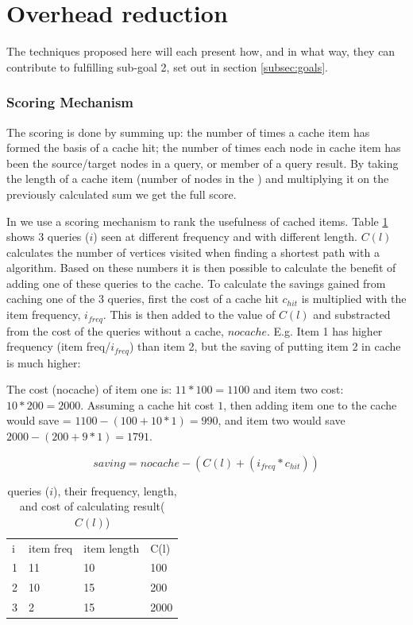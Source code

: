 \section{Overhead reduction}
The techniques proposed here will each present how, and in what way, they can contribute to fulfilling sub-goal 2, set out in section \ref{subsec:goals}.

\subsubsection{Scoring Mechanism}


The scoring is done by summing up: the number of times a cache item has formed the basis of a cache hit; the number of times each node in cache item has been the source/target nodes in a query, or member of a query result. By taking the length of a cache item (number of nodes in the \spath) and multiplying it on the previously calculated sum we get the full score.

In \osc we use a scoring mechanism to rank the usefulness of cached items. Table \ref{tab:score} shows 3 queries ($i$) seen at different frequency and with different length. $C(l)$ calculates the number of vertices visited when finding a shortest path with a \spath algorithm. Based on these numbers it is then possible to calculate the benefit of adding one of these \spath queries to the cache. To calculate the savings gained from caching one of the 3 queries, first the cost of a cache hit $c_{hit}$ is multiplied with the item frequency, $i_{freq}$. This is then added to the value of $C(l)$ and substracted from the cost of the queries without a cache, $nocache$. E.g. Item 1 has higher frequency (item freq/$i_{freq}$) than item 2, but the saving of putting item 2 in cache is much higher:

The cost (nocache) of item one is: $11*100=1100$ and item two cost: $10*200=2000$. Assuming a cache hit cost $1$, then adding item one to the cache would save = $1100-(100+10*1)=990$, and item two would save $2000-(200+9*1)=1791$. 

\begin{equation}\label{eq:cachesaving}
saving = nocache - (C(l) + (i_{freq} * c_{hit}))
\end{equation}


\begin{table}
\begin{center}
\begin{tabular}{l |l |l |l}
i & item freq & item length & C(l) \\
1 & 11 & 10 & 100 \\
2 & 10 & 15 & 200 \\
3 & 2 & 15 & 2000 \\
\end{tabular}
\end{center}
\caption{\spath queries ($i$), their frequency, length, and cost of calculating result($C(l)$)}
\label{tab:score}
\end{table}


